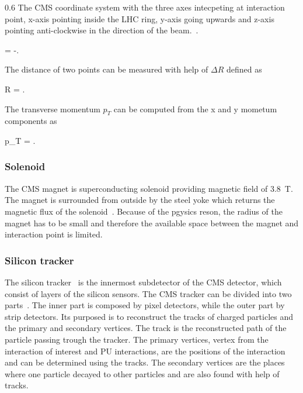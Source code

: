                  {0.6}       %
                 { The CMS coordinate system with the three axes intecpeting at interaction point, x-axis pointing inside the LHC ring, y-axis going upwards and z-axis pointing anti-clockwise in the direction of the beam.~\cite{Pantaleo:2293435}. }

{
    \eta =  -.
}

The distance of two points can be measured with help of $\Delta R$ defined as

{
    \Delta R = .
}


The transverse momentum $p_{T}$ can be computed from the x and y mometum components as

{
    p_{T} =  .
}


\subsubsection{Solenoid}


The CMS magnet is superconducting solenoid providing magnetic field of 3.8~T. The magnet is surrounded from outside by the steel yoke which returns the magnetic flux of the solenoid~\cite{tdrMagnet}. Because of the pgysics reson, the radius of the magnet has to be small and therefore the available space between the magnet and interaction point is limited.

\subsubsection{Silicon tracker}

The silicon tracker~\cite{CMS:1997tlf, CMS:2000eqx} is the innermost subdetector of the CMS detector, which consist of layers of the silicon sensors. The CMS tracker can be divided into two parts~\cite{CMS:1997tlf}. The inner part is composed by pixel detectors, while the outer part by strip detectors. Its purposed is to reconstruct the tracks of charged particles and the primary and secondary vertices. The track is the reconstructed path of the particle passing trough the tracker. The primary vertices, vertex from the interaction of interest and PU interactions, are the positions of the interaction and can be determined using the tracks. The secondary vertices are the places where one particle decayed to other particles and are also found with help of tracks. 


